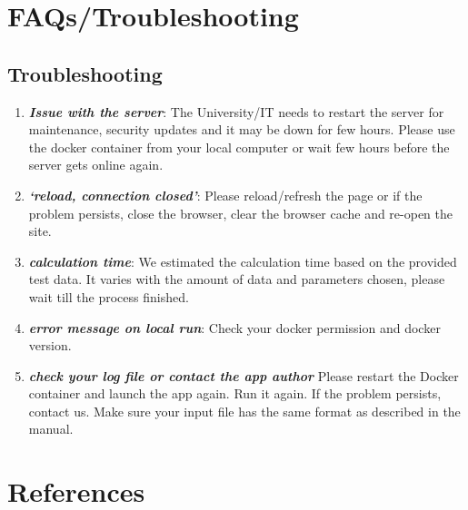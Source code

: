 \documentclass[
  a4paper,
  oneside,
  open=any]{scrreport}
\providecommand{\tightlist}{%
  \setlength{\itemsep}{0pt}\setlength{\parskip}{0pt}}\usepackage{longtable,booktabs,array}
\begin{document}
\hypertarget{sec-faq}{%
\chapter{FAQs/Troubleshooting}\label{sec-faq}}

\hypertarget{troubleshooting}{%
\section{Troubleshooting}\label{troubleshooting}}

\begin{enumerate}
\def\labelenumi{\arabic{enumi}.}
\tightlist
\item
  \textbf{\emph{Issue with the server}}: The University/IT needs to
  restart the server for maintenance, security updates and it may be
  down for few hours. Please use the docker container from your local
  computer or wait few hours before the server gets online again.
\item
  \textbf{\emph{`reload, connection closed'}}: Please reload/refresh the
  page or if the problem persists, close the browser, clear the browser
  cache and re-open the site.
\item
  \textbf{\emph{calculation time}}: We estimated the calculation time
  based on the provided test data. It varies with the amount of data and
  parameters chosen, please wait till the process finished.
\item
  \textbf{\emph{error message on local run}}: Check your docker
  permission and docker version.
\item
  \textbf{\emph{check your log file or contact the app author}} Please
  restart the Docker container and launch the app again. Run it again.
  If the problem persists, contact us. Make sure your input file has the
  same format as described in the manual.
\end{enumerate}

\hypertarget{references}{%
\chapter*{References}\label{references}}



\printbibliography
\end{document}
